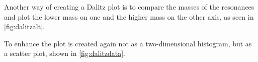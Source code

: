 Another way of creating a Dalitz plot is to compare the masses of the resonances 
and plot the lower mass on one and the higher mass on the other axis, as seen in \autoref{fig:dalitzalt}.


To enhance the plot is created again not as a two-dimensional histogram, 
but as a scatter plot, shown in \autoref{fig:dalitzdata}.


